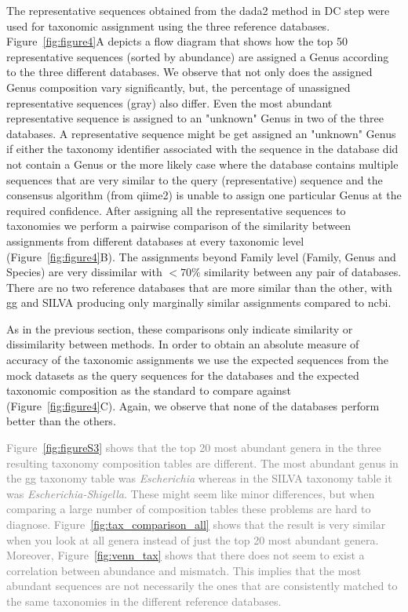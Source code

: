   The representative sequences obtained from the \ac{dada2} method in DC step were used for taxonomic assignment using the three reference databases.
  Figure~\ref{fig:figure4}A depicts a flow diagram that shows how the top 50 representative sequences (sorted by abundance) are assigned a Genus according to the three different databases.
  We observe that not only does the assigned Genus composition vary significantly, but, the percentage of unassigned representative sequences (gray) also differ.
  Even the most abundant representative sequence is assigned to an "unknown" Genus in two of the three databases.
  A representative sequence might be get assigned an "unknown" Genus if either the taxonomy identifier associated with the sequence in the database did not contain a Genus or the more likely case where the database contains multiple sequences that are very similar to the query (representative) sequence and the consensus algorithm (from \ac{qiime2}) is unable to assign one particular Genus at the required confidence.
  After assigning all the representative sequences to taxonomies we perform a pairwise comparison of the similarity between assignments from different databases at every taxonomic level (Figure~\ref{fig:figure4}B).
  The assignments beyond Family level (Family, Genus and Species) are very dissimilar with $<70\%$ similarity between any pair of databases.
  There are no two reference databases that are more similar than the other, with \ac{gg} and SILVA producing only marginally similar assignments compared to \ac{ncbi}.

  As in the previous section, these comparisons only indicate similarity or dissimilarity between methods.
  In order to obtain an absolute measure of accuracy of the taxonomic assignments we use the expected sequences from the mock datasets as the query sequences for the databases and the expected taxonomic composition as the standard to compare against (Figure~\ref{fig:figure4}C).
  Again, we observe that none of the databases perform better than the others.

  \textcolor{gray}{
    Figure~\ref{fig:figureS3} shows that the top 20 most abundant genera in the three resulting taxonomy composition tables are different.
    The most abundant genus in the \ac{gg} taxonomy table was \textit{Escherichia} whereas in the SILVA taxonomy table it was \textit{Escherichia-Shigella}.
    These might seem like minor differences, but when comparing a large number of composition tables these problems are hard to diagnose.
    Figure~\ref{fig:tax_comparison_all} shows that the result is very similar when you look at all genera instead of just the top 20 most abundant genera.
    Moreover, Figure~\ref{fig:venn_tax} shows that there does not seem to exist a correlation between abundance and mismatch.
    This implies that the most abundant sequences are not necessarily the ones that are consistently matched to the same taxonomies in the different reference databases.
  }

